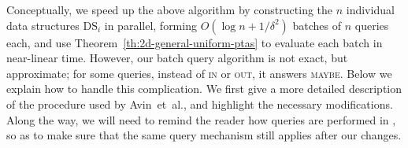 \documentclass[11pt]{article}
\theoremstyle{remark}
\begin{document}
Conceptually, we speed up the above algorithm by constructing the $n$ individual data structures $\mbox{DS}_i$ in parallel, forming $O(\log n + 1/\delta^2)$ batches of $n$ queries each, and use Theorem~\ref{th:2d-general-uniform-ptas} to evaluate each batch in near-linear time.  However, our batch query algorithm is not exact, but approximate; for some queries, instead of \textsc{in} or \textsc{out}, it answers \textsc{maybe}.  Below we explain how to handle this complication.  We first give a more detailed description of the procedure used by Avin~et~al., and highlight the necessary modifications.  Along the way, we will need to remind the reader how queries are performed in \cite{aeklpr-sdciawn-12}, so as to make sure that the same query mechanism still applies after our changes.
\end{document}
